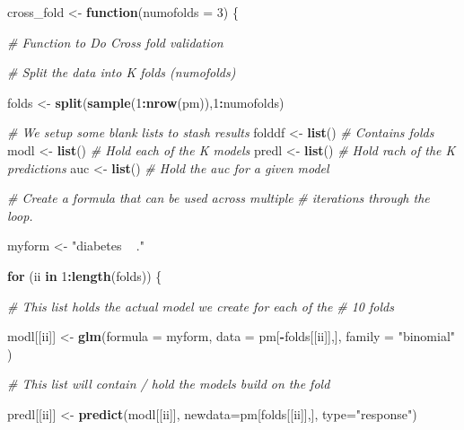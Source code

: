 \documentclass[]{book}
\newenvironment{Shaded}{\begin{snugshade}}{\end{snugshade}}
\newcommand{\KeywordTok}[1]{\textcolor[rgb]{0.13,0.29,0.53}{\textbf{#1}}}
\newcommand{\DataTypeTok}[1]{\textcolor[rgb]{0.13,0.29,0.53}{#1}}
\newcommand{\DecValTok}[1]{\textcolor[rgb]{0.00,0.00,0.81}{#1}}
\newcommand{\StringTok}[1]{\textcolor[rgb]{0.31,0.60,0.02}{#1}}
\newcommand{\CommentTok}[1]{\textcolor[rgb]{0.56,0.35,0.01}{\textit{#1}}}
\newcommand{\ControlFlowTok}[1]{\textcolor[rgb]{0.13,0.29,0.53}{\textbf{#1}}}
\newcommand{\OperatorTok}[1]{\textcolor[rgb]{0.81,0.36,0.00}{\textbf{#1}}}
\newcommand{\NormalTok}[1]{#1}
\begin{document}
\begin{Shaded}
\begin{Highlighting}[]
\NormalTok{cross_fold <-}\StringTok{ }\ControlFlowTok{function}\NormalTok{(}\DataTypeTok{numofolds =} \DecValTok{3}\NormalTok{) \{}
  
  \CommentTok{# Function to Do Cross fold validation}
  
  \CommentTok{# Split the data into K folds (numofolds)}
  
\NormalTok{  folds <-}\StringTok{ }\KeywordTok{split}\NormalTok{(}\KeywordTok{sample}\NormalTok{(}\DecValTok{1}\OperatorTok{:}\KeywordTok{nrow}\NormalTok{(pm)),}\DecValTok{1}\OperatorTok{:}\NormalTok{numofolds) }
  
  \CommentTok{# We setup some blank lists to stash results}
\NormalTok{  folddf    <-}\StringTok{ }\KeywordTok{list}\NormalTok{()  }\CommentTok{# Contains folds}
\NormalTok{  modl      <-}\StringTok{ }\KeywordTok{list}\NormalTok{()  }\CommentTok{# Hold each of the K models}
\NormalTok{  predl     <-}\StringTok{ }\KeywordTok{list}\NormalTok{()  }\CommentTok{# Hold rach of the K predictions}
\NormalTok{  auc       <-}\StringTok{ }\KeywordTok{list}\NormalTok{()  }\CommentTok{# Hold the auc for a given model}
  
  \CommentTok{# Create a formula that can be used across multiple}
  \CommentTok{# iterations through the loop. }
  
\NormalTok{  myform <-}\StringTok{ "diabetes ~ ."}
  
  \ControlFlowTok{for}\NormalTok{ (ii }\ControlFlowTok{in} \DecValTok{1}\OperatorTok{:}\KeywordTok{length}\NormalTok{(folds)) \{}
    
    \CommentTok{# This list holds the actual model we create for each of the }
    \CommentTok{# 10 folds}
    
\NormalTok{    modl[[ii]] <-}\StringTok{ }\KeywordTok{glm}\NormalTok{(}\DataTypeTok{formula =}\NormalTok{ myform, }
                      \DataTypeTok{data =}\NormalTok{ pm[}\OperatorTok{-}\NormalTok{folds[[ii]],],}
                      \DataTypeTok{family =} \StringTok{"binomial"}
\NormalTok{    )}
    
    \CommentTok{# This list will contain / hold the models build on the fold}
    
\NormalTok{    predl[[ii]]  <-}\StringTok{ }\KeywordTok{predict}\NormalTok{(modl[[ii]],}
                            \DataTypeTok{newdata=}\NormalTok{pm[folds[[ii]],],}
                            \DataTypeTok{type=}\StringTok{"response"}\NormalTok{)}
    

\end{Highlighting}
\end{Shaded}
\end{document}
